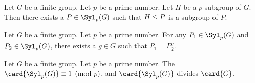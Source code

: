 \begin{theorem}
Let $G$ be a finite group. Let $p$ be a prime number.
Let $H$ be a $p$-subgroup of $G$.
Then there exists a $P\in\Syl_{p}(G)$ such that $H\leq P$ is a
subgroup of $P$.
\end{theorem}

\begin{theorem}
Let $G$ be a finite group. Let $p$ be a prime number.
For any $P_{1}\in\Syl_{p}(G)$ and $P_{2}\in\Syl_{p}(G)$, there exists
a $g\in G$ such that $P_{1}=P_{2}^{g}$.
\end{theorem}

\begin{theorem}
Let $G$ be a finite group.
Let $p$ be a prime number.
The $\card{\Syl_{p}(G)}\equiv1\pmod{p}$, and $\card{\Syl_{p}(G)}$
divides $\card{G}$.
\end{theorem}